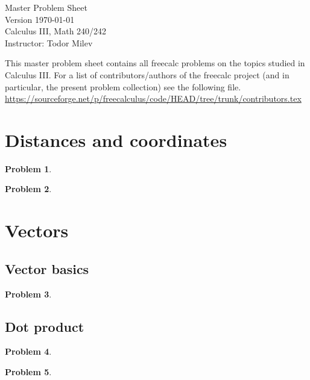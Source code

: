 \documentclass{article}
\newtheorem{problem}{Problem}
\begin{document}
\begin{center}
\Large
Master Problem Sheet \\
Version \today
 \\ Calculus III, Math 240/242 \\ \normalsize Instructor: Todor Milev

\end{center}

This master problem sheet contains all freecalc problems on the topics studied in Calculus III. For a list of contributors/authors of the freecalc project (and in particular, the present problem collection) see the following file.
\url{https://sourceforge.net/p/freecalculus/code/HEAD/tree/trunk/contributors.tex}


\fcLicenseContent



\tableofcontents

\section{Distances and coordinates}
\begin{problem}

\end{problem}

\begin{problem}

\end{problem}

\section{Vectors}
\subsection{Vector basics}
\begin{problem}

\end{problem}
\subsection{Dot product}
\begin{problem}

\end{problem}

\begin{problem}

\end{problem}
\end{document}
